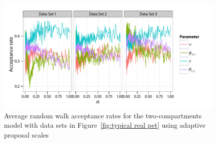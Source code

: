 \begin{figure}[t]
  \linespread{1.1}\selectfont
  \includegraphics[width=\linewidth]{fig_src/Adaptive_Proposal}
  \caption[Acceptance rates of adaptive \protect\smc algorithms]
  {Average random walk acceptance rates for the two-compartments \pet model
    with data sets in Figure~\ref{fig:typical real pet} using adaptive
    proposal scales}
  \label{fig:pet adaptive proposal}
\end{figure}
